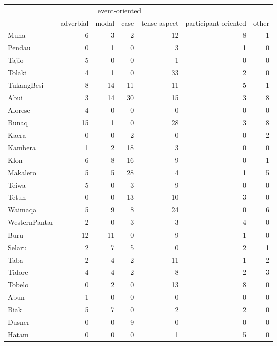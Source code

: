 \begin{table}
\centering

\begin{tabular}{lrrrrrr}
  \lsptoprule
  & \multicolumn{4}{c|}{event-oriented} & & \\
 & {adverbial} & {modal} & {case} & {tense-aspect} & {participant-oriented} & {other}\\ 
  \hline
  Muna &   6 &   3 &   2 &  12 &   8 &   1 \\ 
  Pendau &   0 &   1 &   0 &   3 &   1 &   0 \\ 
  Tajio &   5 &   0 &   0 &   1 &   0 &   0 \\ 
  Tolaki &   4 &   1 &   0 &  33 &   2 &   0 \\ 
  TukangBesi &   8 &  14 &  11 &  11 &   5 &   1 \\ \hline
  Abui &   3 &  14 &  30 &  15 &   3 &   8 \\ 
  Alorese &   4 &   0 &   0 &   0 &   0 &   0 \\ 
  Bunaq &  15 &   1 &   0 &  28 &   3 &   8 \\ 
  Kaera &   0 &   0 &   2 &   0 &   0 &   2 \\ 
  Kambera &   1 &   2 &  18 &   3 &   0 &   0 \\ 
  Klon &   6 &   8 &  16 &   9 &   0 &   1 \\ 
  Makalero &   5 &   5 &  28 &   4 &   1 &   5 \\ 
  Teiwa &   5 &   0 &   3 &   9 &   0 &   0 \\ 
  Tetun &   0 &   0 &  13 &  10 &   3 &   0 \\ 
  Waimaqa &   5 &   9 &   8 &  24 &   0 &   6 \\ 
  WesternPantar &   2 &   0 &   3 &   3 &   4 &   0 \\ \hline
  Buru &  12 &  11 &   0 &   9 &   1 &   0 \\ 
  Selaru &   2 &   7 &   5 &   0 &   2 &   1 \\ 
  Taba &   2 &   4 &   2 &  11 &   1 &   2 \\ 
  Tidore &   4 &   4 &   2 &   8 &   2 &   3 \\ 
  Tobelo &   0 &   2 &   0 &  13 &   8 &   0 \\ \hline
  Abun &   1 &   0 &   0 &   0 &   0 &   0 \\ 
  Biak &   5 &   7 &   0 &   2 &   2 &   0 \\ 
  Dusner &   0 &   0 &   9 &   0 &   0 &   0 \\ 
  Hatam &   0 &   0 &   0 &   1 &   5 &   0 \\ 

\end{tabular}
\end{table}
